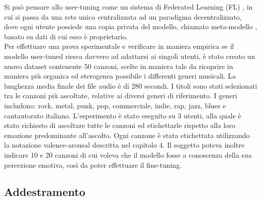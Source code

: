 \documentclass[11pt]{report}
\begin{document}
Si può pensare allo user-tuning come un sistema di Federated Learning (FL) \cite{li2020federated}, in cui si passa da una rete unica centralizzata ad un paradigma decentralizzato, dove ogni utente possiede una copia privata del modello, chiamato meta-modello \cite{vanschoren2019meta}, basato su dati di cui esso è proprietario. \\

Per effettuare una prova sperimentale e verificare in maniera empirica se il modello user-tuned riesca davvero ad adattarsi ai singoli utenti, è stato creato un nuovo dataset contenente 50 canzoni, scelte in maniera tale da ricoprire in maniera più organica ed eterogenea possibile i differenti generi musicali. La lunghezza media finale dei file audio è di 280 secondi. I titoli sono stati selezionati tra le canzoni più ascoltate, relative ai diversi generi di riferimento. I generi includono: rock, metal, punk, pop, commerciale, indie, rap, jazz, blues e cantautorato italiano. L'esperimento è stato eseguito su 3 utenti, alla quale è stato richiesto di ascoltare tutte le canzoni ed etichettarle rispetto alla loro emozione predominante all'ascolto. Ogni canzone è stata etichettata utilizzando la notazione valence-arousal descritta nel capitolo 4. Il soggetto poteva inoltre indicare 10 e 20 canzoni di cui voleva che il modello fosse a conoscenza della sua percezione emotiva, così da poter effettuare il fine-tuning.

\subsection{Addestramento}
\end{document}
